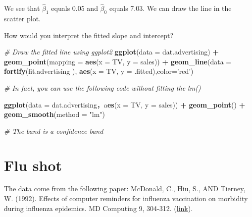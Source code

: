 \documentclass[12pt,]{book}
\newenvironment{Shaded}{\begin{snugshade}}{\end{snugshade}}
\newcommand{\KeywordTok}[1]{\textcolor[rgb]{0.13,0.29,0.53}{\textbf{#1}}}
\newcommand{\DataTypeTok}[1]{\textcolor[rgb]{0.13,0.29,0.53}{#1}}
\newcommand{\StringTok}[1]{\textcolor[rgb]{0.31,0.60,0.02}{#1}}
\newcommand{\CommentTok}[1]{\textcolor[rgb]{0.56,0.35,0.01}{\textit{#1}}}
\newcommand{\OperatorTok}[1]{\textcolor[rgb]{0.81,0.36,0.00}{\textbf{#1}}}
\newcommand{\NormalTok}[1]{#1}
\begin{document}
We see that \(\hat{\beta}_1\) equals 0.05 and \(\hat{\beta}_0\) equals
7.03. We can draw the line in the scatter plot.

How would you interpret the fitted slope and intercept?

\begin{Shaded}
\begin{Highlighting}[]
\CommentTok{# Draw the fitted line using ggplot2 }
\KeywordTok{ggplot}\NormalTok{(}\DataTypeTok{data =}\NormalTok{ dat.advertising) }\OperatorTok{+}\StringTok{ }
\StringTok{  }\KeywordTok{geom_point}\NormalTok{(}\DataTypeTok{mapping =} \KeywordTok{aes}\NormalTok{(}\DataTypeTok{x =}\NormalTok{ TV, }\DataTypeTok{y =}\NormalTok{ sales)) }\OperatorTok{+}
\StringTok{  }\KeywordTok{geom_line}\NormalTok{(}\DataTypeTok{data =} \KeywordTok{fortify}\NormalTok{(fit.advertising ), }\KeywordTok{aes}\NormalTok{(}\DataTypeTok{x =}\NormalTok{ TV, }\DataTypeTok{y =}\NormalTok{ .fitted),}\DataTypeTok{color=}\StringTok{'red'}\NormalTok{)}
\end{Highlighting}
\end{Shaded}

\begin{Shaded}
\begin{Highlighting}[]
\CommentTok{# In fact, you can use the following code without fitting the lm()}

\KeywordTok{ggplot}\NormalTok{(}\DataTypeTok{data =}\NormalTok{ dat.advertising，a}\KeywordTok{es}\NormalTok{(}\DataTypeTok{x =}\NormalTok{ TV, }\DataTypeTok{y =}\NormalTok{ sales)) }\OperatorTok{+}\StringTok{ }
\StringTok{  }\KeywordTok{geom_point}\NormalTok{() }\OperatorTok{+}
\StringTok{  }\KeywordTok{geom_smooth}\NormalTok{(}\DataTypeTok{method =} \StringTok{"lm"}\NormalTok{)}
\end{Highlighting}
\end{Shaded}

\begin{Shaded}
\begin{Highlighting}[]
\CommentTok{# The band is a confidence band }
\end{Highlighting}
\end{Shaded}

\section{Flu shot}\label{flu-shot}

The data come from the following paper: McDonald, C., Hiu, S., AND
Tierney, W. (1992). Effects of computer reminders for influenza
vaccination on morbidity during influenza epidemics. MD Computing 9,
304-312. (\href{https://www.ncbi.nlm.nih.gov/pubmed/1522792}{link}).
\end{document}
